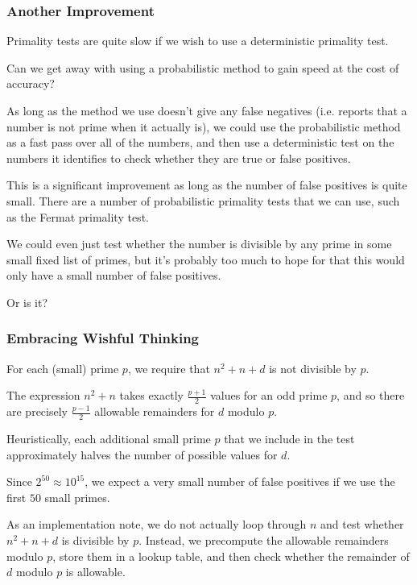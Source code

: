 \documentclass{beamer}
\begin{document}
\begin{frame}

	\frametitle{Another Improvement}

	Primality tests are quite slow if we wish to use a deterministic primality test. \pause

	Can we get away with using a probabilistic method to gain speed at the cost of accuracy? \pause

	As long as the method we use doesn't give any false negatives (i.e. reports that a number is not prime when it actually is), we could use the probabilistic method as a fast pass over all of the numbers, and then use a deterministic test on the numbers it identifies to check whether they are true or false positives. \pause

	This is a significant improvement as long as the number of false positives is quite small. There are a number of probabilistic primality tests that we can use, such as the Fermat primality test. \pause

	We could even just test whether the number is divisible by any prime in some small fixed list of primes, but it's probably too much to hope for that this would only have a small number of false positives. \pause

	Or is it?
\end{frame}

\begin{frame}

	\frametitle{Embracing Wishful Thinking}

	For each (small) prime $p$, we require that $n^2 + n + d$ is not divisible by $p$. \pause

	The expression $n^2 + n$ takes exactly $\frac{p + 1}{2}$ values for an odd prime $p$, and so there are precisely $\frac{p - 1}{2}$ allowable remainders for $d$ modulo $p$. \pause

	Heuristically, each additional small prime $p$ that we include in the test approximately halves the number of possible values for $d$. \pause

	Since $2^{50} \approx 10^{15}$, we expect a very small number of false positives if we use the first $50$ small primes. \pause

	As an implementation note, we do not actually loop through $n$ and test whether $n^2 + n + d$ is divisible by $p$. Instead, we precompute the allowable remainders modulo $p$, store them in a lookup table, and then check whether the remainder of $d$ modulo $p$ is allowable.

\end{frame}
\end{document}
